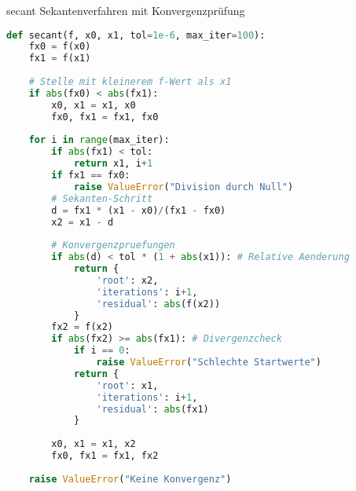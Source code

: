 \begin{examplecode}{secant} Sekantenverfahren mit Konvergenzprüfung
\begin{lstlisting}[language=Python, style=basesmol]
def secant(f, x0, x1, tol=1e-6, max_iter=100):
    fx0 = f(x0)
    fx1 = f(x1)
    
    # Stelle mit kleinerem f-Wert als x1
    if abs(fx0) < abs(fx1):
        x0, x1 = x1, x0
        fx0, fx1 = fx1, fx0
    
    for i in range(max_iter):
        if abs(fx1) < tol:
            return x1, i+1 
        if fx1 == fx0:
            raise ValueError("Division durch Null")
        # Sekanten-Schritt
        d = fx1 * (x1 - x0)/(fx1 - fx0)
        x2 = x1 - d
        
        # Konvergenzpruefungen
        if abs(d) < tol * (1 + abs(x1)): # Relative Aenderung
            return {
                'root': x2,
                'iterations': i+1,
                'residual': abs(f(x2))
            }
        fx2 = f(x2)
        if abs(fx2) >= abs(fx1): # Divergenzcheck
            if i == 0:
                raise ValueError("Schlechte Startwerte")
            return {
                'root': x1,
                'iterations': i+1,
                'residual': abs(fx1)
            }
            
        x0, x1 = x1, x2
        fx0, fx1 = fx1, fx2
        
    raise ValueError("Keine Konvergenz")
\end{lstlisting}
\end{examplecode}


